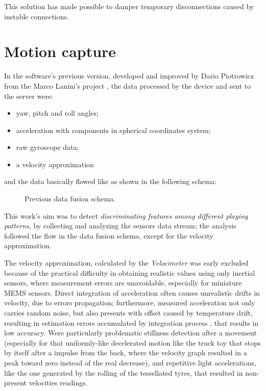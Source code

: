 This solution has made possible to damper temporary disconnections caused by instable connections.

\section{Motion capture}
In the software's previous version, developed and improved by Dario Piotrowicz \cite{Pio19} from the Marco Lanini's project \cite{Lan17}, the data processed by the device and sent to the server were:
\begin{itemize}
	\item yaw, pitch and roll angles;
	\item acceleration with components in spherical coordinates system;
	\item raw gyroscope data;
	\item a velocity approximation
\end{itemize}
and the data basically flowed like as shown in the following schema:

\begin{center}
	\begin{figure}[ht!]
		\caption{Previous data fusion schema.}
	\end{figure}
\end{center}
\bigbreak

This work's aim was to detect \textit{discriminating features among different playing patterns}, by collecting and analyzing the sensors data stream; the analysis followed the flow in the data fusion schema, except for the velocity approximation.
\bigbreak

The velocity approximation, calculated by the \textit{Velocimeter} \cite{Pio19} was early excluded because of the practical difficulty in obtaining realistic values using only inertial sensors, where measurement errors are unavoidable, especially for miniature MEMS sensors. Direct integration of acceleration often causes unrealistic drifts in velocity, due to errors propagation; furthermore, measured acceleration not only carries random noise, but also presents with offset caused by temperature drift, resulting in estimation errors accumulated by integration process \cite{Du15, Est14, Kow15, Liu01, Sei07, UsingAcc, Woo07, Yan06}, that results in low accuracy. Were particularly problematic stillness detection after a movement (especially for that uniformly-like decelerated motion like the truck toy that stops by itself after a impulse from the back, where the velocity graph resulted in a peak toward zero instead of the real decrease), and repetitive light accelerations, like the one generated by the rolling of the tessellated tyres, that resulted in non-present velocities readings.

